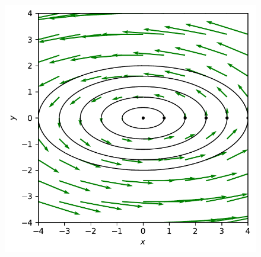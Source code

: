 \begin{columns}
\begin{column}{0.65\textwidth}
\vspace{-0.35in}
\begin{figure}
\includegraphics[scale=0.6]{../plots/ellipse.pdf}
\end{figure}
\end{column}


\end{columns}
